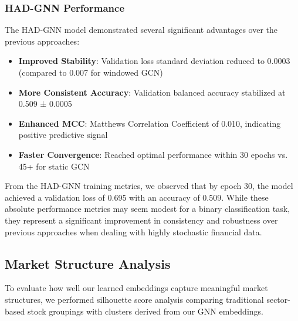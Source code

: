 \documentclass[12pt]{article}
\begin{document}
\subsubsection{HAD-GNN Performance}

The HAD-GNN model demonstrated several significant advantages over the previous approaches:

\begin{itemize}
    \item \textbf{Improved Stability}: Validation loss standard deviation reduced to 0.0003 (compared to 0.007 for windowed GCN)
    \item \textbf{More Consistent Accuracy}: Validation balanced accuracy stabilized at 0.509 ± 0.0005
    \item \textbf{Enhanced MCC}: Matthews Correlation Coefficient of 0.010, indicating positive predictive signal
    \item \textbf{Faster Convergence}: Reached optimal performance within 30 epochs vs. 45+ for static GCN
\end{itemize}

From the HAD-GNN training metrics, we observed that by epoch 30, the model achieved a validation loss of 0.695 with an accuracy of 0.509. While these absolute performance metrics may seem modest for a binary classification task, they represent a significant improvement in consistency and robustness over previous approaches when dealing with highly stochastic financial data.

\subsection{Market Structure Analysis}

To evaluate how well our learned embeddings capture meaningful market structures, we performed silhouette score analysis comparing traditional sector-based stock groupings with clusters derived from our GNN embeddings.
\end{document}

